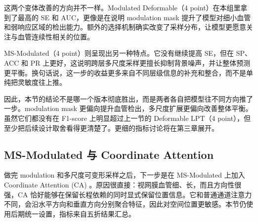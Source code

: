 \documentclass[a4paper,12pt]{article}
\begin{document}
\begin{table}[htbp]
\centering
\caption{Modulated 与多尺度可变形 LPT 实验结果对比}
\label{tab:modulated_msdeform_cn}
\end{table}

这两个变体改善的方向并不一样。Modulated Deformable（4 point）在本组里拿到了最高的 SE 和 AUC，更像是在说明 modulation mask 提升了模型对细小血管和弱响应区域的检出能力。额外的选择机制确实改变了采样分布，让模型更愿意关注与血管连续性相关的位置。

MS-Modulated（4 point）则呈现出另一种特点。它没有继续提高 SE，但在 SP、ACC 和 PR 上更好，这说明跨层多尺度采样更擅长抑制背景噪声，并让整体预测更平衡。换句话说，这一步的收益更多来自不同层级信息的补充和整合，而不是单纯把灵敏度往上推。

因此，本节的结论不是哪一个版本彻底胜出，而是两者各自把模型往不同方向推了一步。modulation mask 更偏向提升血管检出，多尺度扩展更偏向改善整体平衡。虽然它们都没有在 F1-score 上明显超过上一节的 Deformable LPT（4 point），但至少把后续设计取舍看得更清楚了。更细的指标讨论将在第三章展开。

\subsection{MS-Modulated 与 Coordinate Attention}

做完 modulation 和多尺度可变形采样之后，下一步是在 MS-Modulated 上加入 Coordinate Attention (CA) \cite{hou2021coordatt}。原因很直接：视网膜血管细、长，而且方向性很强，CA 恰好能够在保留长程依赖的同时显式保留位置信息。它和普通通道注意力不同，会沿水平方向和垂直方向分别聚合特征，因此对空间位置更敏感。本节仍使用后期统一设置，指标来自五折结果汇总。
\end{document}
